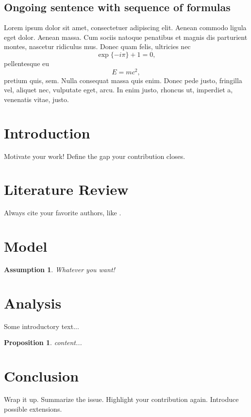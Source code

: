 \documentclass[
	12pt, %
	a4paper, %
	]{article}
\theoremstyle{break} %
\newtheorem{assumption}{Assumption}
\newtheorem{proposition}{Proposition}
\begin{document}
\subsection{Ongoing sentence  with sequence of formulas}
Lorem ipsum dolor sit amet, consectetuer adipiscing elit. Aenean commodo ligula eget dolor. Aenean massa. Cum sociis natoque penatibus et magnis dis parturient montes, nascetur ridiculus mus. Donec quam felis, ultricies nec
\begin{equation}
\exp\{-i\pi\} + 1 = 0,
\end{equation}
pellentesque eu
\begin{equation}
E = m c^2,
\end{equation}
pretium quis, sem. Nulla consequat massa quis enim. Donec pede justo, fringilla vel, aliquet nec, vulputate eget, arcu. In enim justo, rhoncus ut, imperdiet a, venenatis vitae, justo.

\section{Introduction} \label{sec:introduction}
Motivate your work! Define the gap your contribution closes.

\section{Literature Review} \label{sec:literature}
Always cite your favorite authors, like \cite{gersbach2017regulation}.

\section{Model} \label{sec:model}
\begin{assumption}
	Whatever you want!
\end{assumption}

\section{Analysis} \label{sec:analysis}
Some introductory text...
\begin{proposition}\label{prop:label}
	content...
\end{proposition}

\section{Conclusion} \label{sec:conclusion}
Wrap it up.
Summarize the issue.
Highlight your contribution again.
Introduce possible extensions.
\end{document}
